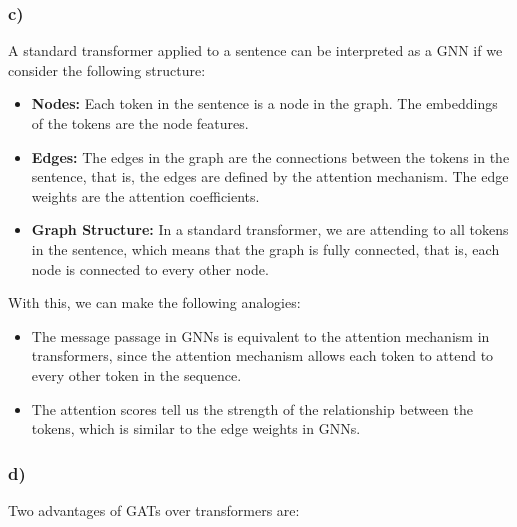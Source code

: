 \documentclass{article}
\begin{document}
\subsubsection*{c)}

A standard transformer applied to a sentence can be interpreted as a GNN if we consider the following structure: 

\begin{itemize}
    \item \textbf{Nodes:} Each token in the sentence is a node in the graph. The embeddings of the tokens are the node features.
    \item \textbf{Edges:} The edges in the graph are the connections between the tokens in the sentence, that is, the edges are defined by the attention mechanism.
The edge weights are the attention coefficients.
    \item \textbf{Graph Structure:} In a standard transformer, we are attending to all tokens in the sentence, which means that the graph is fully connected, that is,
each node is connected to every other node.
\end{itemize}

With this, we can make the following analogies:

\begin{itemize}
    \item The message passage in GNNs is equivalent to the attention mechanism in transformers, since the attention mechanism allows each token to attend to every other token in the sequence.
    \item The attention scores tell us the strength of the relationship between the tokens, which is similar to the edge weights in GNNs.
\end{itemize}

\subsubsection*{d)}

Two advantages of GATs over transformers are:
\end{document}
